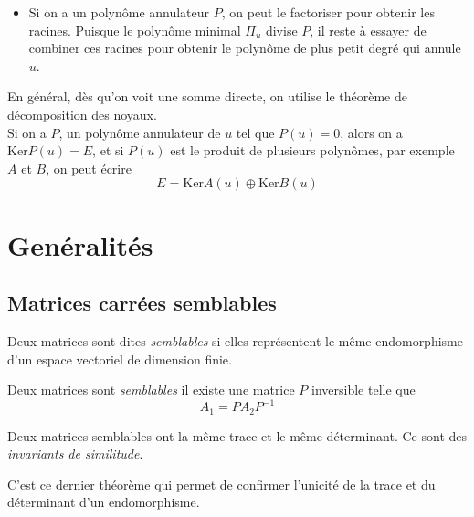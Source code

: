 \documentclass[11pt,a4paper,fleqn,pdftex]{report}
\begin{document}
\begin{methode}
\begin{itemize}
         \item Si on a un polynôme annulateur $P$, on peut le factoriser pour obtenir les racines. Puisque le polynôme minimal $\Pi_u$ divise $P$, il reste à essayer de combiner ces racines pour obtenir le polynôme de plus petit degré qui annule $u$. 
     \end{itemize}
     En général, dès qu'on voit une somme directe, on utilise le théorème de décomposition des noyaux. \\
     Si on a $P$, un polynôme annulateur de $u$ tel que $P(u) = 0$, alors on a $\mathrm{Ker}P(u) = E$, et si $P(u)$ est le produit de plusieurs polynômes, par exemple $A$ et $B$, on peut écrire 
     \[
         E = \mathrm{Ker} A(u) \oplus \mathrm{Ker} B(u)
     \]

\end{methode}
\section{Genéralités}
%
\subsection{Matrices carrées semblables} %
\label{sub:matrices_carrees_semblables}
\begin{dfn}
     Deux matrices sont dites \emph{semblables} si elles représentent le même endomorphisme d'un espace vectoriel de dimension finie.
\end{dfn}
\begin{theorem}
     Deux matrices sont \emph{semblables} \ssi il existe une matrice $P$ inversible telle que 
     \begin{equation}
     A_1 = P A_2 P^{-1}
     \end{equation}
\end{theorem}
\begin{theorem}
     Deux matrices semblables ont la même trace et le même déterminant. Ce sont des \emph{invariants de similitude}.%
\end{theorem}
C'est ce dernier théorème qui permet de confirmer l'unicité de la trace et du déterminant d'un endomorphisme.
\end{document}
